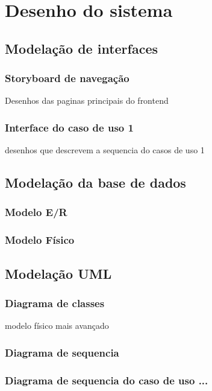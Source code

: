 \chapter{Desenho do sistema}
\label{cap3}

\section{Modelação de interfaces}

\subsection{Storyboard de navegação}

Desenhos das paginas principais do frontend

\subsection{Interface do caso de uso 1}

desenhos que descrevem a sequencia do casos de uso 1

\section{Modelação da base de dados}

\subsection{Modelo E/R}

\subsection{Modelo Físico}

\section{Modelação UML}

\subsection{Diagrama de classes}

modelo físico mais avançado

\subsection{Diagrama de sequencia}

\subsection{Diagrama de sequencia do caso de uso ...}